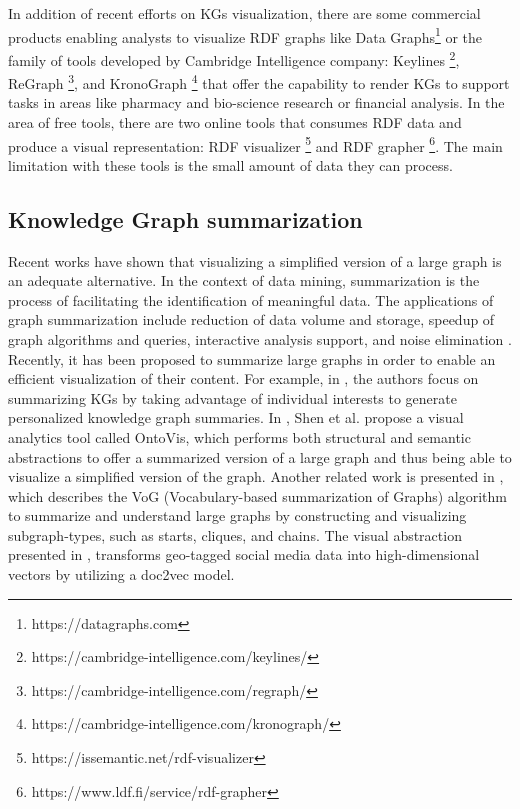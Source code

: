 \documentclass{ieeeaccess}
\begin{document}
In addition of recent efforts on KGs visualization, there are some commercial
products enabling analysts to visualize RDF graphs like Data
Graphs\footnote{https://datagraphs.com} or the 
family of tools developed by Cambridge Intelligence company: Keylines 
\footnote{https://cambridge-intelligence.com/keylines/}, 
ReGraph \footnote{https://cambridge-intelligence.com/regraph/}, and
KronoGraph \footnote{https://cambridge-intelligence.com/kronograph/}
that offer the capability to render KGs to support tasks in areas like 
pharmacy and bio-science research or financial analysis. In the area of 
free tools, there are two online tools that consumes RDF data and produce 
a visual representation: RDF visualizer
\footnote{https://issemantic.net/rdf-visualizer}
and RDF grapher \footnote{https://www.ldf.fi/service/rdf-grapher}. The
main limitation with these tools is the small amount of data they
can process.

\subsection{Knowledge Graph summarization}

Recent works \cite{6787141,1703364,8801911}
have shown that visualizing a simplified version of a large graph is an
adequate alternative. In the context of data mining, summarization is the
process of facilitating the identification of meaningful data. The
applications of graph summarization include reduction of data
volume and storage, speedup of graph algorithms and queries, interactive
analysis support, and noise elimination \cite{liu2018graph}. Recently, it
has been proposed to summarize large graphs in order 
to enable an efficient visualization of their content. For example, in 
\cite{Koutra2019}, the authors focus on summarizing KGs by taking
advantage of individual interests to generate personalized knowledge graph
summaries. In \cite{OntoVis}, Shen et al. propose a visual 
analytics tool called OntoVis, which performs both structural and semantic
abstractions to offer a summarized version of a large graph and thus
being able to visualize a simplified version of the graph. Another
related work is presented in \cite{koutra2014vog}, which describes the VoG
(Vocabulary-based summarization of Graphs) algorithm to summarize and
understand large graphs by constructing and visualizing subgraph-types, 
such as starts, cliques, and chains. The visual abstraction presented in
\cite{8801911}, transforms geo-tagged social media data into high-dimensional
vectors by utilizing a doc2vec model.
\end{document}
